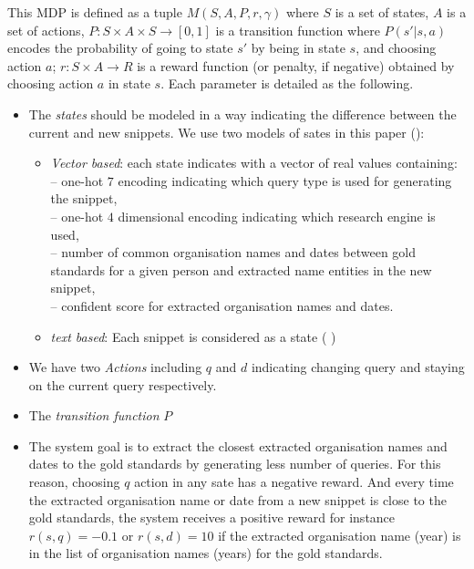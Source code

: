 This MDP is defined as a tuple $M(S, A, P, r, \gamma)$ where $S$ is a set of states, $A$ is a set of actions, $P :S\times A  \times S  \longrightarrow [0,1]$ is a transition function where $P(s'|s,a)$ encodes the probability of going to state $s'$ by being in state $s$, and choosing action $a$; $r : S \times A \longrightarrow R$ is a reward function (or penalty, if negative) obtained by choosing action $a$ in state $s$. Each parameter is detailed as the following.
\begin{itemize}
	\item The \textit{states} should be modeled in a way indicating the difference between the current and new snippets.  We use two models of sates in this paper ():
	\begin{itemize}
		\item \textit{Vector based}: each state indicates with a vector of real values containing: \\
		-- one-hot $7$ encoding indicating which query type is used for generating the snippet,\\
	    -- one-hot $4$ dimensional encoding indicating which research engine is used, \\
		-- number of common organisation names and dates between gold standards for a given person and extracted name entities in the new snippet,\\
        -- confident score for extracted organisation names and dates. 
		\item \textit{text based}: Each snippet is considered as a state (  )
	\end{itemize}
	\item We have two \textit{Actions} including $q$ and $d$ indicating changing query and staying on the current query respectively. 
	\item The \textit{transition function} $P$ 
	\item The system goal is to extract the closest extracted organisation names and dates to the gold standards by generating less number of queries. For this reason, choosing $q$ action in any sate has a negative reward. And every time the extracted organisation name or date from a new snippet is close to the gold standards, the system receives a positive reward for instance $r(s, q) = -0.1$ or $r(s, d) = 10$ if the extracted organisation name (year) is in the list of organisation names (years) for the gold standards. 
\end{itemize}

